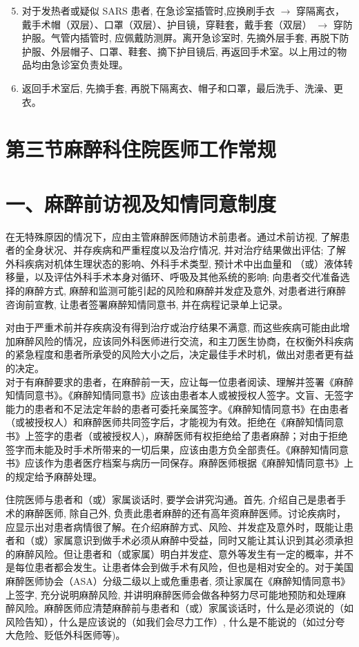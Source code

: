 \documentclass[10pt]{article}
\begin{document}
\begin{enumerate}
  \setcounter{enumi}{4}
  \item 对于发热者或疑似 SARS 患者, 在急诊室插管时,应换刷手衣 $\rightarrow$ 穿隔离衣，戴手术帽（双层）、口罩（双层）、护目镜，穿鞋套，戴手套（双层） $\rightarrow$ 穿防护服。气管内插管时, 应佩戴防测屏。离开急诊室时, 先摘外层手套, 再脱下防护服、外层帽子、口罩、鞋套、摘下护目镜后, 再返回手术室。以上用过的物品均由急诊室负责处理。

  \item 返回手术室后, 先摘手套, 再脱下隔离衣、帽子和口罩，最后洗手、洗澡、更衣。

\end{enumerate}

\section*{第三节麻醉科住院医师工作常规}
\section*{一、麻醉前访视及知情同意制度}
在无特殊原因的情况下，应由主管麻醉医师随访术前患者。通过术前访视, 了解患者的全身状况、并存疾病和严重程度以及治疗情况, 并对治疗结果做出评估; 了解外科疾病对机体生理状态的影响、外科手术类型, 预计术中出血量和 （或）液体转移量，以及评估外科手术本身对循环、呼吸及其他系统的影响; 向患者交代准备选择的麻醉方式, 麻醉和监测可能引起的风险和麻醉并发症及意外, 对患者进行麻醉咨询前宣教, 让患者签署麻醉知情同意书, 并在病程记录单上记录。

对由于严重术前并存疾病没有得到治疗或治疗结果不满意, 而这些疾病可能由此增加麻醉风险的情况，应该同外科医师进行交流，和主刀医生协商，在权衡外科疾病的紧急程度和患者所承受的风险大小之后，决定最佳手术时机，做出对患者更有益的决定。\\
对于有麻醉要求的患者，在麻醉前一天，应让每一位患者阅读、理解并签署《麻醉知情同意书》。《麻醉知情同意书》应该由患者本人或被授权人签字。文盲、无签字能力的患者和不足法定年龄的患者可委托亲属签字。《麻醉知情同意书》在由患者（或被授权人）和麻醉医师共同签字后，才能视为有效。拒绝在《麻醉知情同意书》上签字的患者（或被授权人)，麻醉医师有权拒绝给了患者麻醉；对由于拒绝签字而未能及时手术所带来的一切后果，应该由患方负全部责任。《麻醉知情同意书》应该作为患者医疗档案与病历一同保存。麻醉医师根据《麻醉知情同意书》上的规定给予麻醉处理。

住院医师与患者和（或）家属谈话时, 要学会讲究沟通。首先, 介绍自己是患者手术的麻醉医师, 除自己外, 负责此患者麻醉的还有高年资麻醉医师。讨论疾病时，应显示出对患者病情很了解。在介绍麻醉方式、风险、并发症及意外时，既能让患者和（或）家属意识到做手术必须从麻醉中受益，同时又能让其认识到其必须承担的麻醉风险。但让患者和（或家属）明白并发症、意外等发生有一定的概率，并不是每位患者都会发生。让患者体会到做手术有风险，但也是相对安全的。对于美国麻醉医师协会（ASA）分级二级以上或危重患者, 须让家属在《麻醉知情同意书》上签字, 充分说明麻醉风险, 并讲明麻醉医师会做各种努力尽可能地预防和处理麻醉风险。麻醉医师应清楚麻醉前与患者和（或）家属谈话时，什么是必须说的（如风险告知），什么是应该说的（如我们会尽力工作）, 什么是不能说的（如过分夸大危险、贬低外科医师等)。
\end{document}
